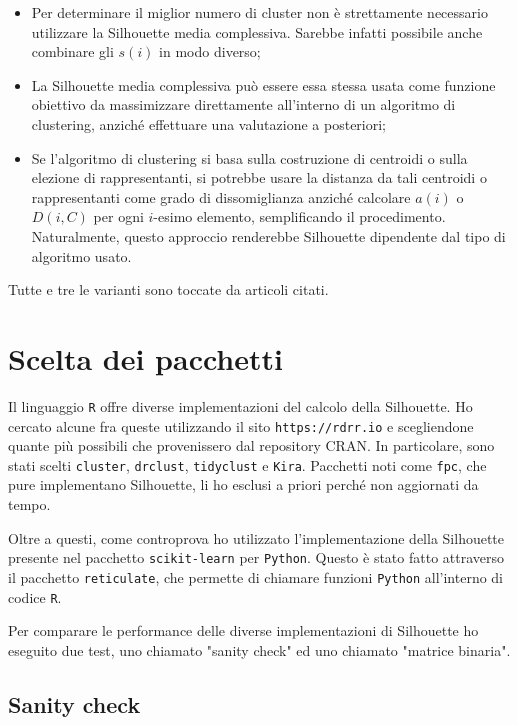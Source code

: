\documentclass[italian]{article}
\begin{document}
			\begin{itemize}
				\item
				Per determinare il miglior numero di cluster non è strettamente
				necessario utilizzare la Silhouette media complessiva. Sarebbe
				infatti possibile anche combinare gli $s(i)$ in modo diverso;
				\item
				La Silhouette media complessiva può essere essa stessa usata
				come funzione obiettivo da massimizzare direttamente all'interno
				di un algoritmo di clustering, anziché effettuare una valutazione
				a posteriori;
				\item
				Se l'algoritmo di clustering si basa sulla costruzione di centroidi
				o sulla elezione di rappresentanti, si potrebbe usare la distanza
				da tali centroidi o rappresentanti come grado di dissomiglianza
				anziché calcolare $a(i)$ o $D(i, C)$ per ogni $i$-esimo elemento,
				semplificando il procedimento. Naturalmente, questo approccio
				renderebbe Silhouette dipendente dal tipo di algoritmo usato. 
			\end{itemize}

			Tutte e tre le varianti sono toccate da articoli citati.

	\section{Scelta dei pacchetti}

		Il linguaggio \texttt{R} offre diverse implementazioni del
		calcolo della Silhouette. Ho cercato alcune fra queste utilizzando
		il sito \texttt{https://rdrr.io} e scegliendone quante più possibili
		che provenissero dal repository CRAN. In particolare, sono stati
		scelti \texttt{cluster}, \texttt{drclust}, \texttt{tidyclust} e
		\texttt{Kira}. Pacchetti noti come \texttt{fpc}, che pure
		implementano Silhouette, li ho esclusi a priori perché non
		aggiornati da tempo.

		Oltre a questi, come controprova ho utilizzato l'implementazione
		della Silhouette presente nel pacchetto \texttt{scikit-learn} per
		\texttt{Python}. Questo è stato fatto attraverso il pacchetto
		\texttt{reticulate}, che permette di chiamare funzioni \texttt{Python}
		all'interno di codice \texttt{R}.

		Per comparare le performance delle diverse implementazioni di
		Silhouette ho eseguito due test, uno chiamato "sanity check" ed
		uno chiamato "matrice binaria".

		\subsection{Sanity check}
\end{document}
